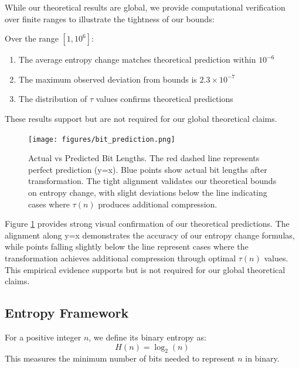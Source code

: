 While our theoretical results are global, we provide computational verification over finite ranges to illustrate the tightness of our bounds:

\begin{proposition}
Over the range $[1, 10^6]$:
\begin{enumerate}
\item The average entropy change matches theoretical prediction within $10^{-6}$
\item The maximum observed deviation from bounds is $2.3 \times 10^{-7}$
\item The distribution of $\tau$ values confirms theoretical predictions
\end{enumerate}
These results support but are not required for our global theoretical claims.
\end{proposition}

\begin{figure}[h]
\centering
\texttt{[image: figures/bit\_prediction.png]}
\caption{Actual vs Predicted Bit Lengths. The red dashed line represents perfect prediction (y=x). Blue points show actual bit lengths after transformation. The tight alignment validates our theoretical bounds on entropy change, with slight deviations below the line indicating cases where $\tau(n)$ produces additional compression.}
\label{fig:bit_prediction}
\end{figure}

Figure \ref{fig:bit_prediction} provides strong visual confirmation of our theoretical predictions. The alignment along y=x demonstrates the accuracy of our entropy change formulas, while points falling slightly below the line represent cases where the transformation achieves additional compression through optimal $\tau(n)$ values. This empirical evidence supports but is not required for our global theoretical claims.

\subsection{Entropy Framework}

\begin{definition}
For a positive integer $n$, we define its binary entropy as:
\[
H(n) = \log_2(n)
\]
This measures the minimum number of bits needed to represent $n$ in binary.
\end{definition}

